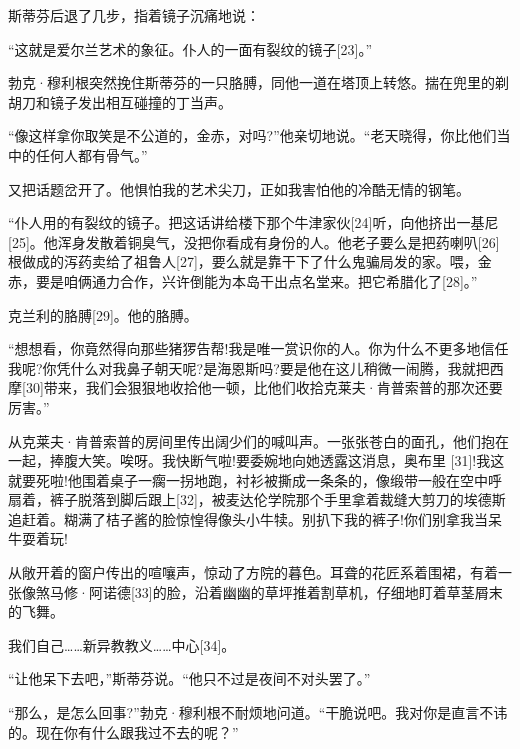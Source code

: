 \documentclass{article}
\begin{document}
斯蒂芬后退了几步，指着镜子沉痛地说：



“这就是爱尔兰艺术的象征。仆人的一面有裂纹的镜子[23]。”



勃克·穆利根突然挽住斯蒂芬的一只胳膊，同他一道在塔顶上转悠。揣在兜里的剃胡刀和镜子发出相互碰撞的丁当声。



“像这样拿你取笑是不公道的，金赤，对吗?”他亲切地说。“老天晓得，你比他们当中的任何人都有骨气。”



又把话题岔开了。他惧怕我的艺术尖刀，正如我害怕他的冷酷无情的钢笔。



“仆人用的有裂纹的镜子。把这话讲给楼下那个牛津家伙[24]听，向他挤出一基尼[25]。他浑身发散着铜臭气，没把你看成有身份的人。他老子要么是把药喇叭[26]根做成的泻药卖给了祖鲁人[27]，要么就是靠干下了什么鬼骗局发的家。喂，金赤，要是咱俩通力合作，兴许倒能为本岛干出点名堂来。把它希腊化了[28]。”



克兰利的胳膊[29]。他的胳膊。



“想想看，你竟然得向那些猪猡告帮!我是唯一赏识你的人。你为什么不更多地信任我呢?你凭什么对我鼻子朝天呢?是海恩斯吗?要是他在这儿稍微一闹腾，我就把西摩[30]带来，我们会狠狠地收拾他一顿，比他们收拾克莱夫·肯普索普的那次还要厉害。”



从克莱夫·肯普索普的房间里传出阔少们的喊叫声。一张张苍白的面孔，他们抱在一起，捧腹大笑。唉呀。我快断气啦!要委婉地向她透露这消息，奥布里 [31]!我这就要死啦!他围着桌子一瘸一拐地跑，衬衫被撕成一条条的，像缎带一般在空中呼扇着，裤子脱落到脚后跟上[32]，被麦达伦学院那个手里拿着裁缝大剪刀的埃德斯追赶着。糊满了桔子酱的脸惊惶得像头小牛犊。别扒下我的裤子!你们别拿我当呆牛耍着玩!



从敞开着的窗户传出的喧嚷声，惊动了方院的暮色。耳聋的花匠系着围裙，有着一张像煞马修·阿诺德[33]的脸，沿着幽幽的草坪推着割草机，仔细地盯着草茎屑末的飞舞。



我们自己……新异教教义……中心[34]。



“让他呆下去吧，”斯蒂芬说。“他只不过是夜间不对头罢了。”



“那么，是怎么回事?”勃克·穆利根不耐烦地问道。“干脆说吧。我对你是直言不讳的。现在你有什么跟我过不去的呢？”
\end{document}
